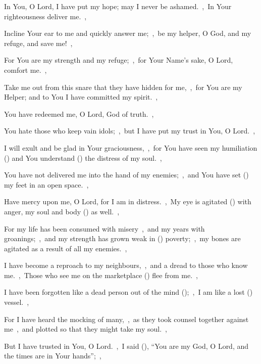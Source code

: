 \documentclass[12pt,twoside,a5paper]{article}
\begin{document}

\begin{normalparskip}
  In You, O Lord, I have put my hope; may I never be ashamed.~\sep\ In Your righteousness deliver me.~\sep


  Incline Your ear to me and quickly answer me;~\sep\ be my helper, O God, and my refuge, and save me!~\sep

  For You are my strength and my refuge;~\sep\ for Your Name's sake, O Lord, comfort me.~\sep

  Take me out from this snare that they have hidden for me,~\sep\ for You are my Helper; and to You I have committed my spirit.~\sep

  You have redeemed me, O Lord, God of truth.~\sep

  You hate those who keep vain idols;~\sep\ but I have put my trust in You, O Lord.~\sep

  I will exult and be glad in Your graciousness,~\sep\ for You have seen my humiliation () and You understand () the distress of my soul.~\sep

  You have not delivered me into the hand of my enemies;~\sep\ and You have set () my feet in an open space.~\sep

  Have mercy upon me, O Lord, for I am in distress.~\sep\ My eye is agitated () with anger, my soul and body () as well.~\sep

  For my life has been consumed with misery~\sep\ and my years with groanings;~\sep\ and my strength has grown weak in () poverty;~\sep\ my bones are agitated as a result of all my enemies.~\sep

  I have become a reproach to my neighbours,~\sep\ and a dread to those who know me.~\sep\ Those who see me on the marketplace () flee from me.~\sep

  I have been forgotten like a dead person out of the mind ();~\sep\ I am like a lost () vessel.~\sep

  For I have heard the mocking of many,~\sep\ as they took counsel together against me~\sep\ and plotted so that they might take my soul.~\sep

  But I have trusted in You, O Lord.~\sep\ I said (), ``You are my God, O Lord, and the times are in Your hands'';~\sep


\end{normalparskip}
\end{document}
